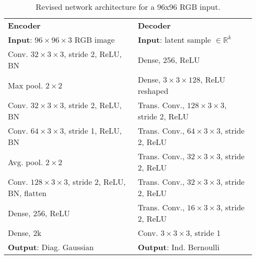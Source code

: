 \documentclass[12pt]{article}
\begin{document}
\begin{table}
\centering
{\footnotesize
\begin{tabularx}{.95\linewidth}{|Y||Y|}
\hline
\textbf{Encoder} & \textbf{Decoder} \\ \hhline{|=||=|}
\textbf{Input}: $96 \times 96 \times 3$ RGB image & \textbf{Input}: latent sample $\in \mathbb{R}^{k}$ \\ \hhline{|-||-|}
Conv. $32 \times 3 \times 3$, stride 2, ReLU, BN & Dense, 256, ReLU \\ \hhline{|-||-|}
Max pool. $2 \times 2$ & Dense, $3 \times 3 \times 128$, ReLU reshaped \\ \hhline{|-||-|}
Conv. $32 \times 3 \times 3$, stride 2, ReLU, BN & Trans. Conv., $128 \times 3 \times 3$, stride 2, ReLU \\ \hhline{|-||-|}
Conv. $64 \times 3 \times 3$, stride 1, ReLU, BN & Trans. Conv., $64 \times 3 \times 3$, stride 2, ReLU \\ \hhline{|-||-|}
Avg. pool. $2 \times 2$ & Trans. Conv., $32 \times 3 \times 3$, stride 2, ReLU \\ \hhline{|-||-|}
Conv. $128 \times 3 \times 3$, stride 2, ReLU, BN, flatten & Trans. Conv., $32 \times 3 \times 3$, stride 2, ReLU \\ \hhline{|-||-|}
Dense, 256, ReLU & Trans. Conv., $16 \times 3 \times 3$, stride 2, ReLU \\ \hhline{|-||-|}
Dense, $2\text{k}$ & Conv. $3 \times 3 \times 3$, stride 1 \\ \hhline{|-||-|}
\textbf{Output}: Diag. Gaussian & \textbf{Output}: Ind. Bernoulli \\ \hline
\end{tabularx}
}
\caption{Revised network architecture for a 96x96 RGB input.}
\label{tab:arch_new}
\end{table}


\printbibliography
\end{document}
